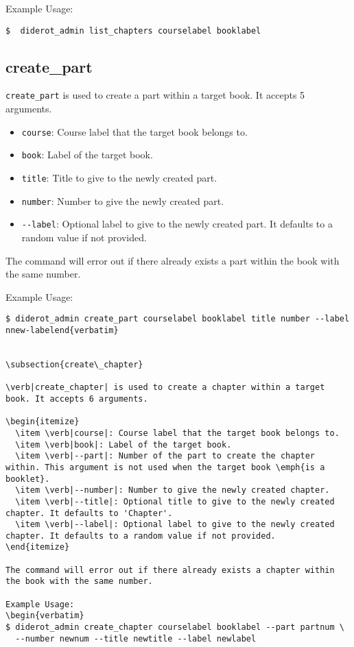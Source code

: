 Example Usage:
\begin{verbatim}
$  diderot_admin list_chapters courselabel booklabel
\end{verbatim}

\subsection{create\_part}

\verb|create_part| is used to create a part within a target book. It accepts 5 arguments.

\begin{itemize}
  \item \verb|course|: Course label that the target book belongs to.
  \item \verb|book|: Label of the target book.
  \item \verb|title|: Title to give to the newly created part.
  \item \verb|number|: Number to give the newly created part.
  \item \verb|--label|: Optional label to give to the newly created part. It defaults to a random value if not provided.
\end{itemize}

The command will error out if there already exists a part within the book with the same number.

Example Usage:
\begin{verbatim}
$ diderot_admin create_part courselabel booklabel title number --label nnew-labelend{verbatim}


\subsection{create\_chapter}

\verb|create_chapter| is used to create a chapter within a target book. It accepts 6 arguments.

\begin{itemize}
  \item \verb|course|: Course label that the target book belongs to.
  \item \verb|book|: Label of the target book.
  \item \verb|--part|: Number of the part to create the chapter within. This argument is not used when the target book \emph{is a booklet}.
  \item \verb|--number|: Number to give the newly created chapter.
  \item \verb|--title|: Optional title to give to the newly created chapter. It defaults to 'Chapter'.
  \item \verb|--label|: Optional label to give to the newly created chapter. It defaults to a random value if not provided.
\end{itemize}

The command will error out if there already exists a chapter within the book with the same number.

Example Usage:
\begin{verbatim}
$ diderot_admin create_chapter courselabel booklabel --part partnum \
  --number newnum --title newtitle --label newlabel
\end{verbatim}

